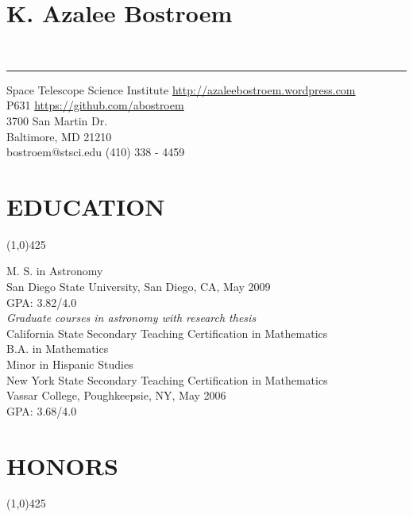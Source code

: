 \documentclass{res}
\begin{document}
 

\section{{\LARGE \bf{K. Azalee Bostroem}}}\\
{\rule{\linewidth}{0.5mm}}
Space Telescope Science Institute \hfill {\color{blue}\url{http://azaleebostroem.wordpress.com}}\\
P631  \hfill {\color{blue}\url{https://github.com/abostroem}} \\
3700 San Martin Dr. \\
Baltimore, MD 21210  \\
bostroem@stsci.edu (410) 338 - 4459

\begin{resume}

\section{EDUCATION}
\vspace{-.2in} 
\begin{center}
\line(1,0){425}
\end{center}
\vspace{-.3in} 
\vspace{0.1in} 
 
    M. S. in Astronomy\\
    San Diego State University, San Diego, CA, May 2009 \\
    GPA: 3.82/4.0 \\
    \emph{Graduate courses in astronomy with research thesis} \\
    
    
    California State Secondary Teaching Certification in Mathematics \\
 
    
    B.A. in Mathematics \\
    Minor in Hispanic Studies \\
    New York State Secondary Teaching Certification in Mathematics \\
    Vassar College, Poughkeepsie, NY, May 2006\\
    GPA: 3.68/4.0   
 
\section{HONORS}
\vspace{-.2in} 
\begin{center}
\line(1,0){425}
\end{center}
\vspace{-.3in} 
\vspace{0.1in} 


\end{resume}
\end{document}

